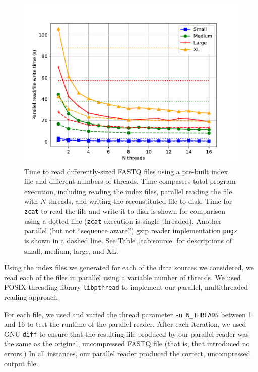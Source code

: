 \begin{figure}[h]
    \includegraphics[width=\linewidth]{figs/threads.pdf}
    \caption{Time to read differently-sized FASTQ \gzip files using a pre-built
    index file and different numbers of threads. Time compasses total program
    execution, including reading the index files, parallel reading the \gzip
    file with $N$ threads, and writing the reconstituted file to disk. Time for
    \texttt{zcat} to read the file and write it to disk is shown for comparison
    using a dotted line (\texttt{zcat} execution is single threaded). Another
    parallel (but not ``sequence aware'') gzip reader implementation
    \texttt{pugz} is shown in a dashed line. See
    Table~\ref{tab:source} for descriptions of small, medium, large, and XL.}
    \label{fig:threads}
\end{figure}

Using the index files we generated for each of the data sources we considered,
we read each of the files in parallel using a variable number of threads. We
used POSIX threading library \texttt{libpthread} to implement our parallel,
multithreaded reading approach.

For each file, we used \ireader and varied the thread parameter \texttt{-n
N\_THREADS} between 1 and 16 to test the runtime of the parallel reader. After
each iteration, we used GNU \texttt{diff} to ensure that the resulting file
produced by our parallel reader was the same as the original, uncompressed FASTQ
file (that is, that \ireader introduced no errors.) In all instances, our
parallel reader produced the correct, uncompressed output file.

